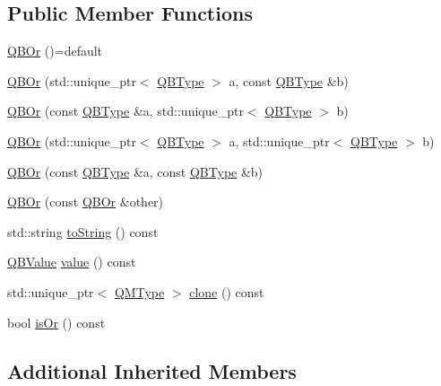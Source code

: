 \subsection*{Public Member Functions}
\begin{DoxyCompactItemize}
\item 
\hyperlink{classQuickMath_1_1QBOr_aaae4140dc674df41797504cacb9eb24f}{Q\+B\+Or} ()=default
\item 
\hyperlink{classQuickMath_1_1QBOr_ae02fedbf26450dabb879ca86f0cfda96}{Q\+B\+Or} (std\+::unique\+\_\+ptr$<$ \hyperlink{classQuickMath_1_1QBType}{Q\+B\+Type} $>$ a, const \hyperlink{classQuickMath_1_1QBType}{Q\+B\+Type} \&b)
\item 
\hyperlink{classQuickMath_1_1QBOr_a7f092c34224329a48ac9ea697200744f}{Q\+B\+Or} (const \hyperlink{classQuickMath_1_1QBType}{Q\+B\+Type} \&a, std\+::unique\+\_\+ptr$<$ \hyperlink{classQuickMath_1_1QBType}{Q\+B\+Type} $>$ b)
\item 
\hyperlink{classQuickMath_1_1QBOr_a07a3f4f70492e1c1c994e59c96ebaa6b}{Q\+B\+Or} (std\+::unique\+\_\+ptr$<$ \hyperlink{classQuickMath_1_1QBType}{Q\+B\+Type} $>$ a, std\+::unique\+\_\+ptr$<$ \hyperlink{classQuickMath_1_1QBType}{Q\+B\+Type} $>$ b)
\item 
\hyperlink{classQuickMath_1_1QBOr_a061922981120c55cff4ac1ee0b0abeb4}{Q\+B\+Or} (const \hyperlink{classQuickMath_1_1QBType}{Q\+B\+Type} \&a, const \hyperlink{classQuickMath_1_1QBType}{Q\+B\+Type} \&b)
\item 
\hyperlink{classQuickMath_1_1QBOr_af6f38dbcafdfbca22cefd966fc5deca8}{Q\+B\+Or} (const \hyperlink{classQuickMath_1_1QBOr}{Q\+B\+Or} \&other)
\item 
std\+::string \hyperlink{classQuickMath_1_1QBOr_ae835a7fda64bca20388ff3a869a9c928}{to\+String} () const 
\item 
\hyperlink{namespaceQuickMath_aec13b08c42d9f8e688241623c8b379a0}{Q\+B\+Value} \hyperlink{classQuickMath_1_1QBOr_a385b6b29141e89e46629da29a8e38c8f}{value} () const 
\item 
std\+::unique\+\_\+ptr$<$ \hyperlink{classQuickMath_1_1QMType}{Q\+M\+Type} $>$ \hyperlink{classQuickMath_1_1QBOr_af1ef65aaf163785db31aefa43253cb6c}{clone} () const 
\item 
bool \hyperlink{classQuickMath_1_1QBOr_ab8f447a7b5fdcbde53cd69e79d4e552d}{is\+Or} () const 
\end{DoxyCompactItemize}
\subsection*{Additional Inherited Members}



